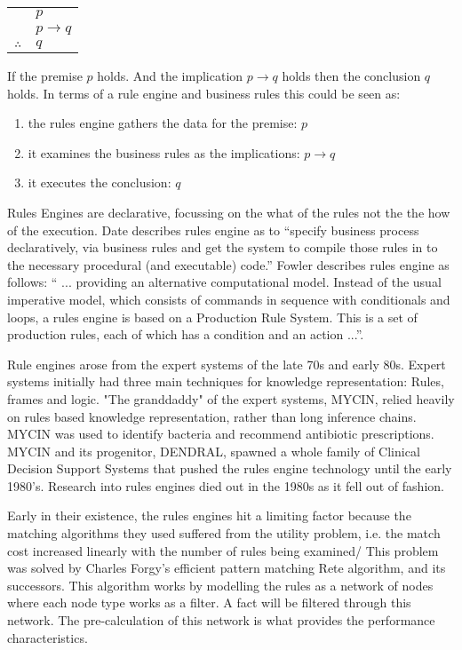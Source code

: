 \begin{tabular}{c@{\,}l@{}} 
    & $p$ \\
\arrayrulecolor{blue!60!green!70}    & $p \to q$ \\\cline{2-2}
$\therefore$         & $q$ \\
\end{tabular}

If the premise $p$ holds. And the implication $p \to q$ holds then the conclusion $q$ holds. 
In terms of a rule engine and business rules this could be seen as:
\begin{enumerate}
    \item the rules engine gathers the data for the premise: $p$
    \item it examines the business rules as the implications: $p \to q$
    \item it executes the conclusion: $q$
\end{enumerate}


Rules Engines are declarative, focussing on the what of the rules not the the how of the execution.
Date\cite{date2000not} describes rules engine as to ``specify business process declaratively, via business rules and get the system to compile those rules in to the necessary procedural (and executable) code.''
Fowler\cite{Fowler_rulesEngine} describes rules engine as follows: `` ... providing an alternative computational model.
Instead of the usual imperative model, which consists of commands in sequence with conditionals and loops, a rules engine is based on a Production Rule System.
This is a set of production rules, each of which has a condition and an action ...''.

Rule engines arose from the expert systems of the late 70s and early 80s. 
Expert systems initially had three main techniques for knowledge representation: Rules, frames and logic\cite{jackson1986introduction}.  
"The granddaddy" of the expert systems, MYCIN, relied heavily on rules based knowledge representation\cite{shortliffe1974mycin}, rather than long inference chains.
MYCIN was used to identify bacteria and recommend antibiotic prescriptions.
MYCIN and its progenitor, DENDRAL, spawned a whole family of Clinical Decision Support Systems that pushed the rules engine technology until the early 1980's.
Research into rules engines died out in the 1980s as it fell out of fashion.

Early in their existence, the rules engines hit a limiting factor because the matching algorithms they used suffered from the utility problem, i.e. the match cost increased linearly with the number of rules being examined/
This problem was solved by Charles Forgy's efficient pattern matching Rete algorithm\cite{forgy1989rete}, and its successors.
This algorithm works by modelling the rules as a network of nodes where each node type works as a filter. 
A fact will be filtered through this network.
The pre-calculation of this network is what provides the performance characteristics.




